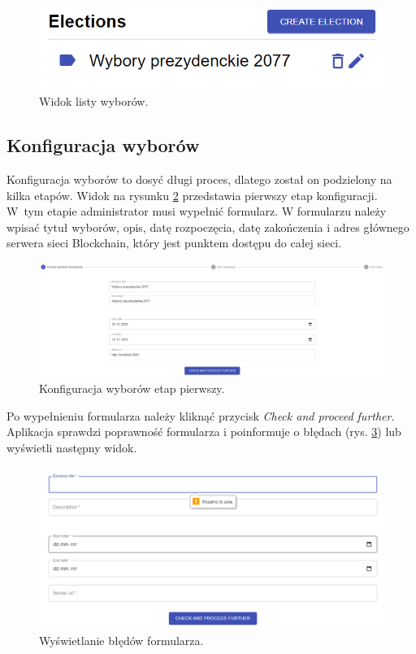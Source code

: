 \documentclass[a4paper,12pt]{book}
\begin{document}
\begin{figure}[h]
	\centering
	\includegraphics[width=\textwidth]{images/electionlist.png}
	\caption{Widok listy wyborów.}\label{electionlist}
\end {figure}

\subsection{Konfiguracja wyborów}

Konfiguracja wyborów to dosyć długi proces, dlatego został on podzielony na kilka etapów. Widok na rysunku \ref{votesconfig1} przedstawia pierwszy etap konfiguracji. W~tym etapie administrator musi wypełnić formularz. W formularzu należy wpisać tytuł wyborów, opis, datę rozpoczęcia, datę zakończenia i adres głównego serwera sieci Blockchain, który jest punktem dostępu do całej sieci.

\begin{figure}[h]
	\centering
	\includegraphics[width=\textwidth]{images/votesconfig1.png}
	\caption{Konfiguracja wyborów etap pierwszy.}\label{votesconfig1}
\end {figure}

Po wypełnieniu formularza należy kliknąć przycisk \textit{Check and proceed further}. Aplikacja sprawdzi poprawność formularza i poinformuje o błędach (rys. \ref{votesconfigerror}) lub wyświetli następny widok.

\begin{figure}[h]
	\centering
	\includegraphics[width=\textwidth]{images/votesconfigerror.png}
	\caption{Wyświetlanie błędów formularza.}\label{votesconfigerror}
\end {figure}
\end{document}
